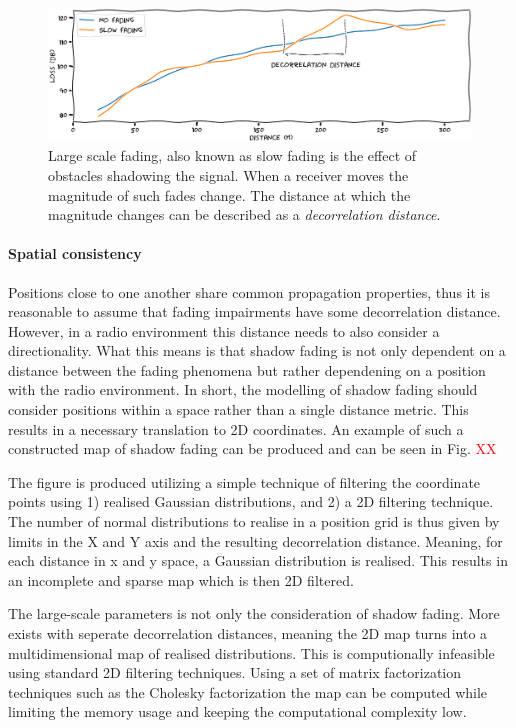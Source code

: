 \begin{figure}[h]
    \centering
    \includegraphics{chapters/part_pathloss/figures/slowfading.eps}
    \caption{Large scale fading, also known as slow fading is the effect of obstacles shadowing the signal. When a receiver moves  the magnitude of such fades change. The distance at which the magnitude changes can be described as a \emph{decorrelation distance}.}
    \label{fig:shadowing_decorrelation_distance}
\end{figure}



\paragraph{Spatial consistency}
Positions close to one another share common propagation properties, thus it is reasonable to assume that fading impairments have some decorrelation distance. However, in a radio environment this distance needs to also consider a directionality. What this means is that shadow fading is not only dependent on a distance between the fading phenomena but rather dependening on a position with the radio environment. In short, the modelling of shadow fading should consider positions within a space rather than a single distance metric. This results in a necessary translation to 2D coordinates. An example of such a constructed map of shadow fading can be produced and can be seen in Fig. \textcolor{red}{XX}


The figure is produced utilizing a simple technique of filtering the coordinate points using 1) realised Gaussian distributions, and 2) a 2D filtering technique. The number of normal distributions to realise in a position grid is thus given by limits in the X and Y axis and the resulting decorrelation distance. Meaning, for each distance in x and y space, a Gaussian distribution is realised. This results in an incomplete and sparse map which is then 2D filtered.

The large-scale parameters is not only the consideration of shadow fading. More exists with seperate decorrelation distances, meaning the 2D map turns into a multidimensional map of realised distributions. This is computionally infeasible using standard 2D filtering techniques. Using a set of matrix factorization techniques such as the Cholesky factorization the map can be computed while limiting the memory usage and keeping the computational complexity low.


